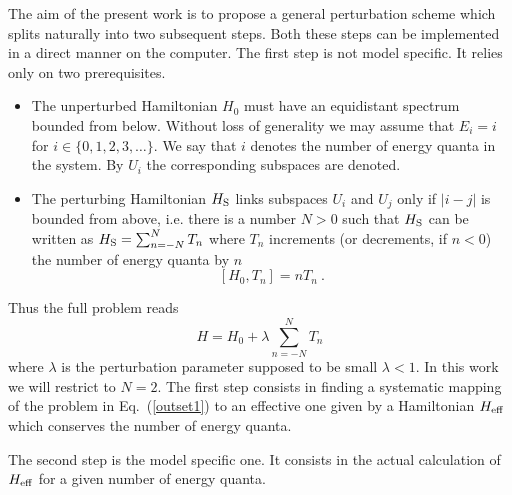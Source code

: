 The aim of the present work is to propose a general 
perturbation scheme which splits naturally into two
subsequent steps. Both these steps can be implemented
in a direct manner on the computer. The first step
is not model specific. It relies only on two prerequisites.
\begin{itemize}
\item[(i)]
The unperturbed Hamiltonian $H_0$ must have an equidistant
spectrum bounded from below. Without loss of generality
we may assume that $E_i = i$ for $i\in \{0,1,2,3,\ldots\}$.
We say that $i$ denotes the number of energy quanta in
the system. By $U_i$ the corresponding subspaces are denoted.
\item[(ii)]
The perturbing
Hamiltonian $H_{\rm S}$ links subspaces $U_i$ and $U_j$
only if $|i-j|$ is bounded from above, i.e. there is a
number $N>0$ such that $H_{\rm S}$ can be written as
$H_{\rm S} = \sum_{n=-N}^N T_n$ where $T_n$ increments 
(or decrements, if $n<0$) the number of energy quanta by
$n$
\begin{equation}
\label{outset0}
[ H_0,T_n] = n T_n\ .
\end{equation}
\end{itemize}
 Thus the full problem reads
\begin{equation}
\label{outset1}
H = H_0 + \lambda\sum_{n=-N}^N T_n
\end{equation}
where $\lambda$ is the perturbation parameter supposed to 
be small $\lambda < 1$.
In this work we will restrict to $N=2$.
The first step consists in finding a systematic mapping
of the problem in Eq.~(\ref{outset1}) to an effective one given by
a Hamiltonian
$H_{\rm eff}$ which conserves the number of energy quanta.

The second step is the model specific one. It consists in
the actual calculation of $H_{\rm eff}$ for a given number
of energy quanta.

